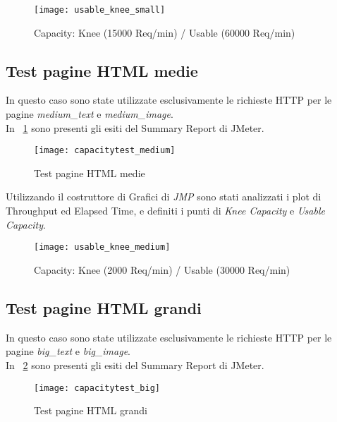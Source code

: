 \begin{figure}[!htbp]
  \centering
  \texttt{[image: usable\_knee\_small]}
  \caption{Capacity: Knee (15000 Req/min) / Usable (60000 Req/min)}
\end{figure}

\subsection{Test pagine HTML medie}
In questo caso sono state utilizzate esclusivamente le richieste HTTP per le pagine
\textit{medium\_text} e \textit{medium\_image}.\\
In \figurename~\ref{webserver_medium_page_summary_report} sono presenti gli esiti del
Summary Report di JMeter.\\

\begin{figure}[!htbp]
  \centering
  \texttt{[image: capacitytest\_medium]}
  \caption{Test pagine HTML medie}
  \label{webserver_medium_page_summary_report}
\end{figure}

Utilizzando il costruttore di Grafici di \textit{JMP} sono stati analizzati i plot
di Throughput ed Elapsed Time, e definiti i punti di \textit{Knee Capacity} e
\textit{Usable Capacity}.\\

\begin{figure}[!htbp]
  \centering
  \texttt{[image: usable\_knee\_medium]}
  \caption{Capacity: Knee (2000 Req/min) / Usable (30000 Req/min)}
\end{figure}

\clearpage

\subsection{Test pagine HTML grandi}
In questo caso sono state utilizzate esclusivamente le richieste HTTP per le pagine
\textit{big\_text} e \textit{big\_image}.\\
In \figurename~\ref{webserver_big_page_summary_report} sono presenti gli esiti del
Summary Report di JMeter.\\

\begin{figure}[!htbp]
  \centering
  \texttt{[image: capacitytest\_big]}
  \caption{Test pagine HTML grandi}
  \label{webserver_big_page_summary_report}
\end{figure}

